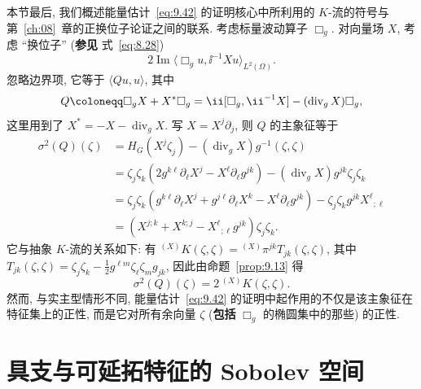 本节最后, 我们概述能量估计~\eqref{eq:9.42} 的证明核心中所利用的 $K$-流的符号与第~\ref{ch:08}~章的正换位子论证之间的联系. 考虑标量波动算子 $\Box_g$. 对向量场 $X$, 考虑 ``换位子'' (\textbf{参见} 式~\eqref{eq:8.28})
\begin{equation}\label{eq:9.60}
    2 \operatorname{Im} \langle \Box_g u, \ii^{-1} X u \rangle_{L^2(\Omega)}.
\end{equation}
忽略边界项, 它等于 $\langle Q u, u \rangle$, 其中
\begin{equation}\label{eq:9.61}
    Q \defeq \Box_g X + X^* \Box_g = \ii [\Box_g, \ii^{-1} X] - (\operatorname{div}_g X) \Box_g,
\end{equation}
这里用到了 $X^* = -X - \operatorname{div}_g X$. 写 $X = X^j \partial_j$, 则 $Q$ 的主象征等于
\begin{equation}\label{eq:9.62}
    \begin{aligned}
        \sigma^2(Q)(\zeta) &= H_G(X^j \zeta_j) - (\operatorname{div}_g X) g^{-1}(\zeta, \zeta) \\
        &= \zeta_j \zeta_k \left( 2 g^{k\ell} \partial_\ell X^j - X^\ell \partial_\ell g^{jk} \right) - (\operatorname{div}_g X) g^{jk} \zeta_j \zeta_k \\
        &= \zeta_j \zeta_k \left( g^{k\ell} \partial_\ell X^j + g^{j\ell} \partial_\ell X^k - X^\ell \partial_\ell g^{jk} \right) - \zeta_j \zeta_k g^{jk} X^\ell{}_{;\ell} \\
        &= \left( X^{j;k} + X^{k;j} - X^\ell{}_{;\ell} g^{jk} \right) \zeta_j \zeta_k.
    \end{aligned}
\end{equation}
它与抽象 $K$-流的关系如下: 有 ${}^{(X)} K(\zeta, \zeta) = {}^{(X)} \pi^{jk} T_{jk}(\zeta, \zeta)$, 其中 $T_{jk}(\zeta, \zeta) = \zeta_j \zeta_k - \frac12 g^{\ell m} \zeta_\ell \zeta_m g_{jk}$, 因此由命题~\ref{prop:9.13} 得
\begin{equation}\label{eq:9.63}
    \sigma^2(Q)(\zeta) = 2 \, {}^{(X)} K(\zeta, \zeta).
\end{equation}
然而, 与实主型情形不同, 能量估计~\eqref{eq:9.42} 的证明中起作用的不仅是该主象征在特征集上的正性, 而是它对所有余向量 $\zeta$ (\textbf{包括} $\Box_g$ 的椭圆集中的那些) 的正性.

\section{具支与可延拓特征的 Sobolev 空间}\label{sec:9.3}
%
%
%

